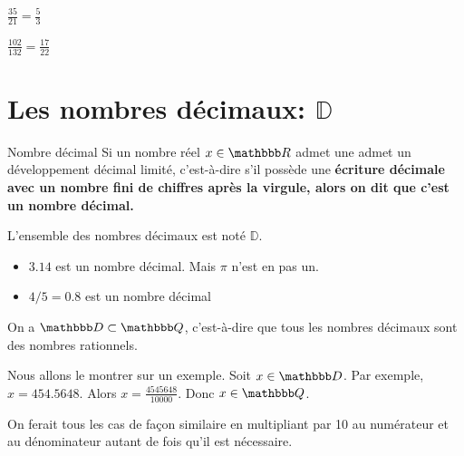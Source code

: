 \documentclass[10pt,a4paper,openany,twoside,prof]{book}
\begin{document}
\begin{ex}{}{}
	$\frac{35}{21} = \frac{5}{3}$

	$\frac{102}{132} = \frac{17}{22}$
\end{ex}

\section{Les nombres décimaux: $\mathbb{D}$}

\begin{defi}{Nombre décimal}{}
	Si un nombre réel $x\in\R$ admet une admet un développement décimal limité, c'est-à-dire s'il possède une \bf{écriture décimale} avec un nombre fini de chiffres après la virgule, alors on dit que c'est un \bf{nombre décimal}.

 L'ensemble des nombres décimaux est noté $\mathbb{D}$.
\end{defi}

\begin{ex}{}{}
	\begin{itemize}
		\item $3.14$ est un nombre décimal. Mais $\pi$ n'est en pas un.
		\item $4/5 = 0.8$ est un nombre décimal
	\end{itemize}
\end{ex}

\begin{prop}{}{}
	On a $\D\subset\Q$, c'est-à-dire que tous les nombres décimaux sont des nombres rationnels.
\end{prop}

\begin{dem}{}{}




	Nous allons le montrer sur un exemple. Soit $x\in\D$. Par exemple, $x = 454.5648$. Alors $x=\frac{4545648}{10000}$. Donc $x\in\Q$.

	On ferait tous les cas de façon similaire en multipliant par 10 au numérateur et au dénominateur autant de fois qu'il est nécessaire.
\end{dem}
\end{document}
